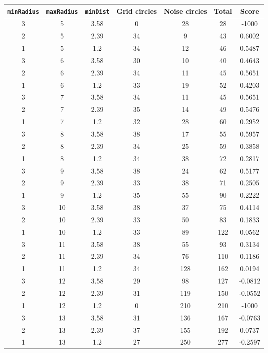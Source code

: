 \documentclass[letterpaper, 12pt]{article}
\begin{document}
\begin{longtable}{|c|c|c|c|c|c|c|}
\hline
\textbf{\texttt{minRadius}} & \textbf{\texttt{maxRadius}} & \textbf{\texttt{minDist}} & \textbf{Grid circles} & \textbf{Noise circles} & \textbf{Total} & \textbf{Score} \\
\hline
3 & 5 & 3.58 & 0 & 28 & 28 & -1000 \\
\hline
2 & 5 & 2.39 & 34 & 9 & 43 & 0.6002 \\
\hline
1 & 5 & 1.2 & 34 & 12 & 46 & 0.5487 \\
\hline
3 & 6 & 3.58 & 30 & 10 & 40 & 0.4643 \\
\hline
2 & 6 & 2.39 & 34 & 11 & 45 & 0.5651 \\
\hline
1 & 6 & 1.2 & 33 & 19 & 52 & 0.4203 \\
\hline
3 & 7 & 3.58 & 34 & 11 & 45 & 0.5651 \\
\hline
2 & 7 & 2.39 & 35 & 14 & 49 & 0.5476 \\
\hline
1 & 7 & 1.2 & 32 & 28 & 60 & 0.2952 \\
\hline
3 & 8 & 3.58 & 38 & 17 & 55 & 0.5957 \\
\hline
2 & 8 & 2.39 & 34 & 25 & 59 & 0.3858 \\
\hline
1 & 8 & 1.2 & 34 & 38 & 72 & 0.2817 \\
\hline
3 & 9 & 3.58 & 38 & 24 & 62 & 0.5177 \\
\hline
2 & 9 & 2.39 & 33 & 38 & 71 & 0.2505 \\
\hline
1 & 9 & 1.2 & 35 & 55 & 90 & 0.2222 \\
\hline
3 & 10 & 3.58 & 38 & 37 & 75 & 0.4114 \\
\hline
2 & 10 & 2.39 & 33 & 50 & 83 & 0.1833 \\
\hline
1 & 10 & 1.2 & 33 & 89 & 122 & 0.0562 \\
\hline
3 & 11 & 3.58 & 38 & 55 & 93 & 0.3134 \\
\hline
2 & 11 & 2.39 & 34 & 76 & 110 & 0.1186 \\
\hline
1 & 11 & 1.2 & 34 & 128 & 162 & 0.0194 \\
\hline
3 & 12 & 3.58 & 29 & 98 & 127 & -0.0812 \\
\hline
2 & 12 & 2.39 & 31 & 119 & 150 & -0.0552 \\
\hline
1 & 12 & 1.2 & 0 & 210 & 210 & -1000 \\
\hline
3 & 13 & 3.58 & 31 & 136 & 167 & -0.0763 \\
\hline
2 & 13 & 2.39 & 37 & 155 & 192 & 0.0737 \\
\hline
1 & 13 & 1.2 & 27 & 250 & 277 & -0.2597 \\

\end{longtable}
\end{document}
